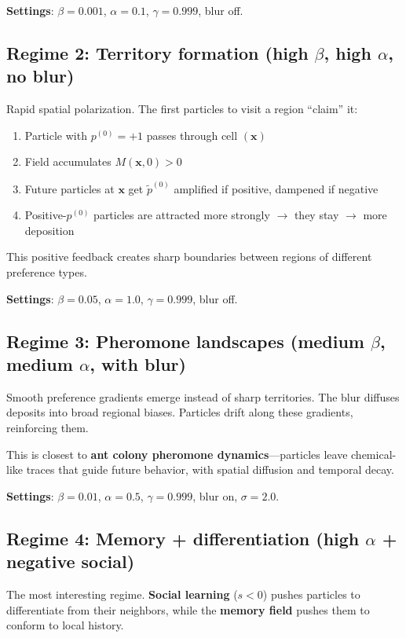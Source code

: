 \documentclass[11pt,a4paper]{article}
\begin{document}
\textbf{Settings}: $\beta = 0.001$, $\alpha = 0.1$, $\gamma = 0.999$, blur off.

\subsection{Regime 2: Territory formation (high $\beta$, high $\alpha$, no blur)}

Rapid spatial polarization. The first particles to visit a region ``claim'' it:
\begin{enumerate}[nosep]
\item Particle with $p^{(0)} = +1$ passes through cell $(\mathbf{x})$
\item Field accumulates $M(\mathbf{x}, 0) > 0$
\item Future particles at $\mathbf{x}$ get $\tilde{p}^{(0)}$ amplified if positive, dampened if negative
\item Positive-$p^{(0)}$ particles are attracted more strongly $\rightarrow$ they stay $\rightarrow$ more deposition
\end{enumerate}

This positive feedback creates sharp boundaries between regions of different preference types.

\textbf{Settings}: $\beta = 0.05$, $\alpha = 1.0$, $\gamma = 0.999$, blur off.

\subsection{Regime 3: Pheromone landscapes (medium $\beta$, medium $\alpha$, with blur)}

Smooth preference gradients emerge instead of sharp territories. The blur diffuses deposits into broad regional biases. Particles drift along these gradients, reinforcing them.

This is closest to \textbf{ant colony pheromone dynamics}---particles leave chemical-like traces that guide future behavior, with spatial diffusion and temporal decay.

\textbf{Settings}: $\beta = 0.01$, $\alpha = 0.5$, $\gamma = 0.999$, blur on, $\sigma = 2.0$.

\subsection{Regime 4: Memory + differentiation (high $\alpha$ + negative social)}

The most interesting regime. \textbf{Social learning} ($s < 0$) pushes particles to differentiate from their neighbors, while the \textbf{memory field} pushes them to conform to local history.
\end{document}
